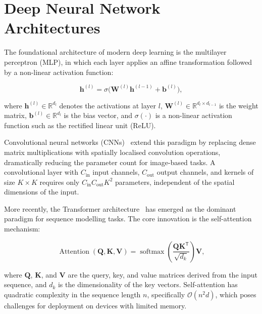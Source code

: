 \section{Deep Neural Network Architectures}

The foundational architecture of modern deep learning is the multilayer
perceptron (MLP), in which each layer applies an affine transformation
followed by a non-linear activation function:

\begin{equation}
\mathbf{h}^{(l)} = \sigma\!\bigl(\mathbf{W}^{(l)}\mathbf{h}^{(l-1)}
+ \mathbf{b}^{(l)}\bigr),
\label{eq:mlp}
\end{equation}

where $\mathbf{h}^{(l)} \in \mathbb{R}^{d_l}$ denotes the activations
at layer $l$, $\mathbf{W}^{(l)} \in \mathbb{R}^{d_l \times d_{l-1}}$ is
the weight matrix, $\mathbf{b}^{(l)} \in \mathbb{R}^{d_l}$ is the bias
vector, and $\sigma(\cdot)$ is a non-linear activation function such as
the rectified linear unit (ReLU).

Convolutional neural networks (CNNs)~\cite{he2016deep} extend this
paradigm by replacing dense matrix multiplications with spatially
localised convolution operations, dramatically reducing the parameter
count for image-based tasks. A convolutional layer with $C_{\text{in}}$
input channels, $C_{\text{out}}$ output channels, and kernels of size
$K \times K$ requires only $C_{\text{in}} C_{\text{out}} K^2$
parameters, independent of the spatial dimensions of the input.

More recently, the Transformer architecture~\cite{vaswani2017attention}
has emerged as the dominant paradigm for sequence modelling tasks. The
core innovation is the self-attention mechanism:

\begin{equation}
\operatorname{Attention}(\mathbf{Q},\mathbf{K},\mathbf{V}) =
\operatorname{softmax}\!\left(\frac{\mathbf{Q}\mathbf{K}^{\mathsf{T}}}
{\sqrt{d_k}}\right)\mathbf{V},
\label{eq:attention}
\end{equation}

where $\mathbf{Q}$, $\mathbf{K}$, and $\mathbf{V}$ are the query, key,
and value matrices derived from the input sequence, and $d_k$ is the
dimensionality of the key vectors. Self-attention has quadratic
complexity in the sequence length $n$, specifically $\mathcal{O}(n^2
d)$, which poses challenges for deployment on devices with limited
memory.
